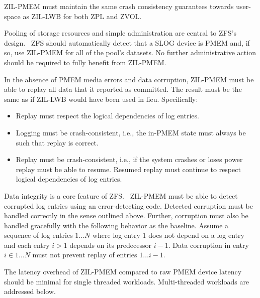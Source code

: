 \documentclass[12pt,a4paper,twoside,draft]{book}
\begin{document}
ZIL-PMEM must maintain the same crash consistency guarantees towards user-space as ZIL-LWB for both ZPL and ZVOL.

Pooling of storage resources and simple administration are central to ZFS's design.~\cite{zfspaper}
ZFS should automatically detect that a SLOG device is PMEM and, if so, use ZIL-PMEM for all of the pool’s datasets.
No further administrative action should be required to fully benefit from ZIL-PMEM.

In the absence of PMEM media errors and data corruption, ZIL-PMEM must be able to replay all data that it reported as committed.
The result must be the same as if ZIL-LWB would have been used in lieu.
Specifically:
\begin{itemize}[noitemsep,beginpenalty=100000,midpenalty=100000]
\item Replay must respect the logical dependencies of log entries.
\item Logging must be crash-consistent, i.e., the in-PMEM state must always be such that replay is correct.
\item Replay must be crash-consistent, i.e., if the system crashes or loses power replay must be able to resume. Resumed replay must continue to respect logical dependencies of log entries.
\end{itemize}

Data integrity is a core feature of ZFS.~\cite{zfspaper}
ZIL-PMEM must be able to detect corrupted log entries using an error-detecting code.
Detected corruption must be handled correctly in the sense outlined above.
Further, corruption must also be handled gracefully with the following behavior as the baseline.
Assume a sequence of log entries $1 \dots N$ where log entry $1$ does not depend on a log entry and each entry $i > 1$ depends on its predecessor $i-1$.
Data corruption in entry $i \in 1 \dots N$ must not prevent replay of entries $1 \dots i-1$.

The latency overhead of ZIL-PMEM compared to raw PMEM device latency should be minimal for single threaded workloads.
Multi-threaded workloads are addressed below.
\end{document}
